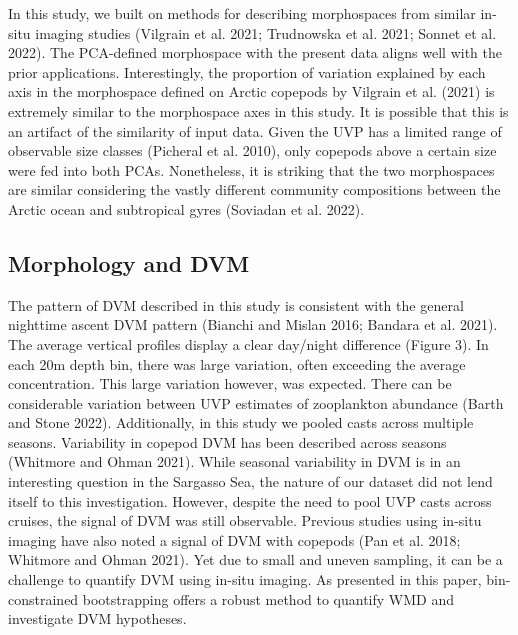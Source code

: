 \documentclass[
  letterpaper,
  DIV=11,
  numbers=noendperiod]{scrartcl}
\begin{document}
In this study, we built on methods for describing morphospaces from
similar in-situ imaging studies (Vilgrain et al. 2021; Trudnowska et al.
2021; Sonnet et al. 2022). The PCA-defined morphospace with the present
data aligns well with the prior applications. Interestingly, the
proportion of variation explained by each axis in the morphospace
defined on Arctic copepods by Vilgrain et al. (2021) is extremely
similar to the morphospace axes in this study. It is possible that this
is an artifact of the similarity of input data. Given the UVP has a
limited range of observable size classes (Picheral et al. 2010), only
copepods above a certain size were fed into both PCAs. Nonetheless, it
is striking that the two morphospaces are similar considering the vastly
different community compositions between the Arctic ocean and
subtropical gyres (Soviadan et al. 2022).

\hypertarget{morphology-and-dvm}{%
\subsection{Morphology and DVM}\label{morphology-and-dvm}}

The pattern of DVM described in this study is consistent with the
general nighttime ascent DVM pattern (Bianchi and Mislan 2016; Bandara
et al. 2021). The average vertical profiles display a clear day/night
difference (Figure 3). In each 20m depth bin, there was large variation,
often exceeding the average concentration. This large variation however,
was expected. There can be considerable variation between UVP estimates
of zooplankton abundance (Barth and Stone 2022). Additionally, in this
study we pooled casts across multiple seasons. Variability in copepod
DVM has been described across seasons (Whitmore and Ohman 2021). While
seasonal variability in DVM is in an interesting question in the
Sargasso Sea, the nature of our dataset did not lend itself to this
investigation. However, despite the need to pool UVP casts across
cruises, the signal of DVM was still observable. Previous studies using
in-situ imaging have also noted a signal of DVM with copepods (Pan et
al. 2018; Whitmore and Ohman 2021). Yet due to small and uneven
sampling, it can be a challenge to quantify DVM using in-situ imaging.
As presented in this paper, bin-constrained bootstrapping offers a
robust method to quantify WMD and investigate DVM hypotheses.
\end{document}
